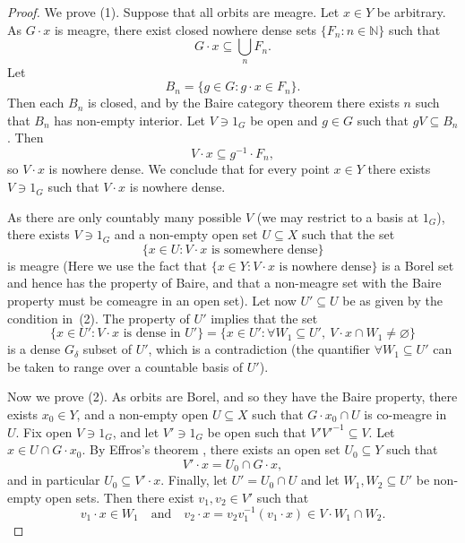 \documentclass[12pt]{amsart}
\numberwithin{equation}{section}
\theoremstyle{plain}
\theoremstyle{definition}
\begin{document}
\begin{proof}
	
	We prove (1).
	Suppose that all orbits are meagre. Let $x \in Y$ be arbitrary.
	As $G \cdot x$ is meagre, there exist closed nowhere dense sets
	$\{F_n : n \in \mathbb{N}\}$ such that
	\[
	G \cdot x \subseteq \bigcup_{n} F_n.
	\]
	Let
	\[
	B_n = \{ g \in G : g \cdot x \in F_n \}.
	\]
	Then each $B_n$ is closed, and by the Baire category theorem there exists $n$
	such that $B_n$ has non-empty interior.
	Let $V \ni 1_G$ be open and $g \in G$ such that $gV \subseteq B_n$.
	Then
	\[
	V \cdot x \subseteq g^{-1} \cdot F_n,
	\]
	so $V \cdot x$ is nowhere dense.
	We conclude that for every point $x \in Y$ there exists $V \ni 1_G$ such that
	$V \cdot x$ is nowhere dense.
	
	As there are only countably many possible $V$ (we may restrict to a basis at $1_G$),
	there exists $V \ni 1_G$ and a non-empty open set $U \subseteq X$ such that the set
	\[
	\{ x \in U : V \cdot x \text{ is somewhere dense} \}
	\]
	is meagre (Here we use the fact that $\{ x \in Y : V \cdot x \text{ is nowhere dense} \}$ is a Borel set and hence has the property of Baire, and that a non-meagre set with the Baire property must be comeagre in an open set). Let now $U' \subseteq U$ be as given by the condition in~(2).
	The property of $U'$ implies that the set
	\[
	\{ x \in U' : V \cdot x \text{ is dense in } U' \}
	=
	\{ x \in U' : \forall W_1 \subseteq U',\ V \cdot x \cap W_1 \neq \varnothing \}
	\]
	is a dense $G_\delta$ subset of $U'$, which is a contradiction
	(the quantifier $\forall W_1 \subseteq U'$ can be taken to range over a countable
	basis of $U'$).
	
	Now we prove (2).
	As orbits are Borel, and so they have the Baire property, there exists $x_0 \in Y$, and a non-empty open $U \subseteq X$ such that $G \cdot x_0 \cap U$ is co-meagre in $U$. Fix open $V \ni 1_G$, and 
	let $V' \ni 1_G$ be open such that $V' V'^{-1} \subseteq V$.
	Let $x \in U \cap G \cdot x_0$.
	By Effros's theorem \cite[Theorem ???]{Gao}, there exists an open set $U_0 \subseteq Y$ such that
	\[
	V' \cdot x = U_0 \cap G \cdot x,
	\]
	and in particular $U_0 \subseteq V' \cdot x$.
	Finally, let $U' = U_0 \cap U$ and let $W_1, W_2 \subseteq U'$ be non-empty open sets.
	Then there exist $v_1, v_2 \in V'$ such that
	\[
	v_1 \cdot x \in W_1
	\quad\text{and}\quad
	v_2 \cdot x = v_2 v_1^{-1} (v_1 \cdot x) \in V \cdot W_1 \cap W_2.
	\]
	
\end{proof}
\end{document}
